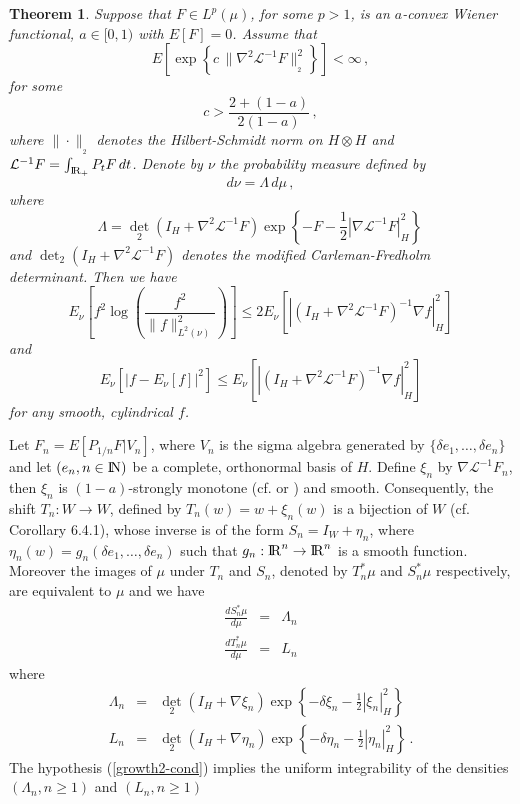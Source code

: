 \documentclass[12pt,a4paper]{book}
\newtheorem{theorem}{Theorem}[section]
\newcommand{\beaa}{\begin{eqnarray*}}
\newcommand{\eeaa}{\end{eqnarray*}}
\newcommand{\La}{\Lambda}
\renewcommand{\L}{{\mathcal L}}
\newcommand{\reals}{{\rm I\!R}}
\newcommand{\NN}{{\rm I\!N}}
\newcommand{\R}{{\rm I\!R}}
\newcommand{\dett}{{\textstyle{\det_2}}}
\newcommand{\proof}{\noindent {\bf Proof:\ }}
\begin{document}
\begin{theorem}
\label{log-sob-tordu}
Suppose that $F\in L^p(\mu)$, for some $p>1$, is an $a$-convex Wiener
functional, $a\in [0,1)$ with $E[F]=0$. Assume that
\begin{equation}
\label{growth2-cond}
E\left[\exp\left\{ c\,\|\nabla^2 \L^{-1}F\|_{_2}^2\right\}\right]<\infty\,,
\end{equation}
for some
$$
c>\frac{2+(1-a)}{2(1-a)}\,,
$$
where $\|\cdot\|_{_2}$ denotes the Hilbert-Schmidt norm on $H\otimes
H$ and $\L^{-1}F=\int_{\R_+}P_tF\,dt$. Denote by $\nu$ the
probability measure defined by
$$
d\nu=\La\,d\mu\,,
$$
where
$$
\La=\dett(I_H+\nabla^2\L^{-1}F)\exp\left\{-F-\frac{1}{2}|\nabla
  \L^{-1}F|_H^2\right\}\,
$$
and $\dett(I_H+\nabla^2\L^{-1}F)$ denotes the modified Carleman-Fredholm
determinant. Then we have
\begin{equation}
\label{eqn-tordu}
E_\nu\left[f^2\log\left(\frac{f^2}{\|f\|^2_{L^2(\nu)}}\right)\right]\leq
2 E_\nu\left[|(I_H+\nabla^2 \L^{-1}F)^{-1}\nabla f|_H^2\right]
\end{equation}
and
\begin{equation}
\label{poincare-tordu}
E_\nu[|f-E_\nu[f]|^2]\leq E_\nu\left[|(I_H+\nabla^2
  \L^{-1}F)^{-1}\nabla f|_H^2\right]
\end{equation}
for any smooth, cylindrical $f$.
\end{theorem}
\proof
Let $F_n=E[P_{1/n}F|V_n]$, where $V_n$ is the sigma algebra generated
by $\{\delta e_1,\ldots,\delta e_n\}$ and let  $(e_n,n\in \NN)$ be  a complete,
orthonormal basis of $H$. Define $\xi_n$ by $\nabla \L^{-1}F_n$, then
$\xi_n$ is $(1-a)$-strongly monotone (cf. \cite{UZ0} or \cite{UZ7}) and
smooth. Consequently, the shift $T_n:W\to W$, defined by
$T_n(w)=w+\xi_n(w)$ is a bijection of $W$ (cf. \cite{UZ7} Corollary
6.4.1), whose inverse is of the form $S_n=I_W+\eta_n$, where
$\eta_n(w)=g_n(\delta e_1,\ldots,\delta e_n)$ such that
$g_n:\reals^n\to \reals^n$ is a smooth function. Moreover the images of
$\mu$ under $T_n$ and $S_n$, denoted by $T_n^*\mu$ and $S_n^*\mu$
respectively,  are equivalent to $\mu$ and we have
\beaa
\frac{dS_n^*\mu}{d\mu}&=&\La_n\\
\frac{dT_n^*\mu}{d\mu}&=&L_n
\eeaa
where
\beaa
\La_n&=&\dett(I_H+\nabla \xi_n)\exp\left\{-\delta
  \xi_n-\frac{1}{2}|\xi_n|_H^2\right\}\\
L_n&=&\dett(I_H+\nabla \eta_n)\exp\left\{-\delta
  \eta_n-\frac{1}{2}|\eta_n|_H^2\right\}\,.
\eeaa
The hypothesis (\ref{growth2-cond}) implies the uniform integrability
of the densities $(\La_n,n\geq 1)$ and $(L_n,n\geq 1)$
\end{document}
